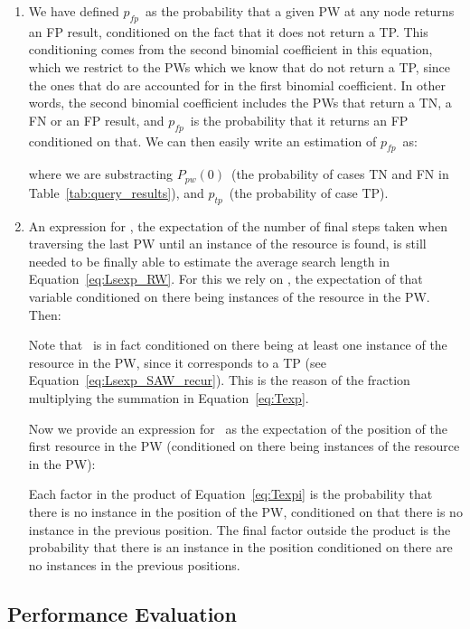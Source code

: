 \documentclass[]{elsarticle}
\newcommand{\ptp}       {\ensuremath{p_{t\!p}}}
\newcommand{\pfp}       {\ensuremath{p_{\!f\!p}}}
\newcommand{\PWx}[1]    {\ensuremath{P_{pw}(#1)}}
\begin{document}
\begin{enumerate}
\item

We have defined \pfp\ as the probability that a given PW at any node returns an FP result, conditioned on the fact that it does not return a TP. This conditioning comes from the second binomial coefficient in this equation, which we restrict to the  PWs which we know that do not return a TP, since the ones that do are accounted for in the first binomial coefficient. In other words, the second binomial coefficient includes the PWs that return a TN, a FN or an FP result, and \pfp\ is the probability that it returns an FP conditioned on that. We can then easily write an estimation of \pfp\ as:


\noindent where we are substracting \PWx{0}\ (the probability of cases TN and FN in Table~\ref{tab:query_results}), and \ptp\ (the probability of case TP).


\item

An expression for \Texp, the expectation of the number of final steps taken when traversing the last PW until an instance of the resource is found, is still needed to be finally able to estimate the average search length in Equation~\ref{eq:Lsexp_RW}. For this we rely on , the expectation of that variable conditioned on there being  instances of the resource in the PW. Then:



\noindent Note that \Texp\ is in fact conditioned on there being at least one instance of the resource in the PW, since it corresponds to a TP (see Equation~\ref{eq:Lsexp_SAW_recur}). This is the reason of the fraction multiplying the summation in Equation~\ref{eq:Texp}.

Now we provide an expression for \ as the expectation of the position of the first resource in the PW (conditioned on there being  instances of the resource in the PW):



\noindent Each factor in the product of Equation~\ref{eq:Texpi} is the probability that there is no instance in the  position of the PW, conditioned on that there is no instance in the previous position. The final factor outside the product is the probability that there is an instance in the  position conditioned on there are no instances in the previous positions. 

\end{enumerate}


\subsection{Performance Evaluation}
\end{document}
